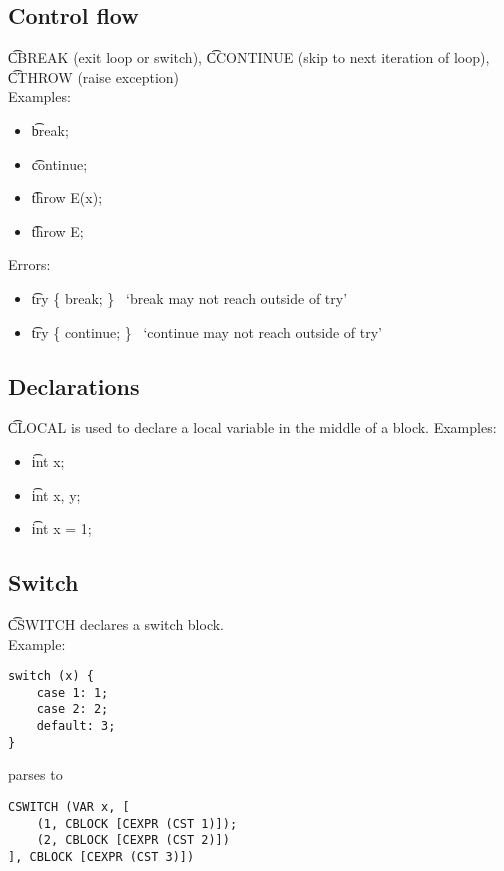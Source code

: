 \subsection{Control flow}
\t{CBREAK} (exit loop or switch), \t{CCONTINUE} (skip to next iteration of loop), \t{CTHROW} (raise exception)\\
Examples:
\begin{itemize}
    \item \t{break;} \to\ 
    \item \t{continue;} \to\ 
    \item \t{throw E(x);} \to\ 
    \item \t{throw E;} \to\ 
\end{itemize}
Errors:
\begin{itemize}
    \item \t{try \{ break; \}} \to\ `break may not reach outside of try'
    \item \t{try \{ continue; \}} \to\ `continue may not reach outside of try'
\end{itemize}

\subsection{Declarations}
\t{CLOCAL} is used to declare a local variable in the middle of a block.
Examples:
\begin{itemize}
    \item \t{int x;} \to\ 
    \item \t{int x, y;} \to\ 
    \item \t{int x = 1;} \to\ 
\end{itemize}

\subsection{Switch}
\t{CSWITCH} declares a switch block.\\
Example:
\begin{verbatim}
switch (x) {
    case 1: 1;
    case 2: 2;
    default: 3;
}
\end{verbatim}
parses to
\begin{verbatim}
CSWITCH (VAR x, [
    (1, CBLOCK [CEXPR (CST 1)]);
    (2, CBLOCK [CEXPR (CST 2)])
], CBLOCK [CEXPR (CST 3)])
\end{verbatim}

